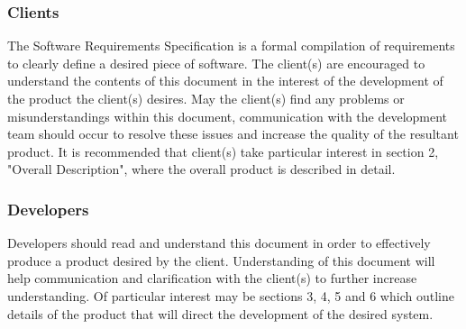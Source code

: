 \documentclass{article}
\begin{document}
\subsubsection{Clients}
\begin{adjustwidth}{2em}{0pt}
The Software Requirements Specification is a formal compilation of requirements to clearly define a desired piece of software. The client(s) are encouraged to understand the contents of this document in the interest of the development of the product the client(s) desires. May the client(s) find any problems or misunderstandings within this document, communication with the development team should occur to resolve these issues and increase the quality of the resultant product.
It is recommended that client(s) take particular interest in section 2, "Overall Description", where the overall product is described in detail. 
\begin{comment}
The clients will be the final users of the system, so the SRS will provide an overall view of the capabilities of the system and how hardware and software will interact to provide the final product. An area of particular interest is Part 2, where the overall description of the product is outlined. \newline\newline
\end{comment}
\end{adjustwidth}
\subsubsection{Developers}
\begin{adjustwidth}{2em}{0pt}
Developers should read and understand this document in order to effectively produce a product desired by the client. Understanding of this document will help communication and clarification with the client(s) to further increase understanding. 
Of particular interest may be sections 3, 4, 5 and 6 which outline details of the product that will direct the development of the desired system. 
\begin{comment}
The SRS provides a detailed view of the technical workings of the rover, with Parts 3, 4, 5 and 6 being of particular note as they outline the detailed user stories, the planned project features, and other requirements that will direct the development of the prototype rover.
\end{comment}
\end{adjustwidth}
\end{document}
